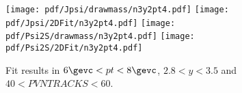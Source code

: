 \begin{figure}[H]
\begin{center}
\texttt{[image: pdf/Jpsi/drawmass/n3y2pt4.pdf]}
\texttt{[image: pdf/Jpsi/2DFit/n3y2pt4.pdf]}
\vspace*{-0.5cm}
\texttt{[image: pdf/Psi2S/drawmass/n3y2pt4.pdf]}
\texttt{[image: pdf/Psi2S/2DFit/n3y2pt4.pdf]}
\vspace*{-0.5cm}
\end{center}
\caption{Fit results in $6\gevc<pt<8\gevc$, $2.8<y<3.5$ and $40<PVNTRACKS<60$.}
\label{Fitn3y2pt4}
\end{figure}
